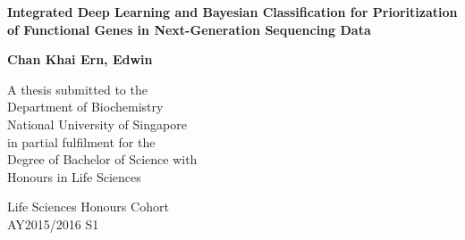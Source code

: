 \documentclass{article}
\begin{document}
\begin{titlepage}


    \begin{center} 
	\Large
        \vspace*{1cm}
        
        \textbf{ Integrated Deep Learning and Bayesian Classification for Prioritization of Functional Genes in Next-Generation Sequencing Data }
        
        \vspace{0.5cm}
        
        \vspace{1.0cm}
        
        \textbf{Chan Khai Ern, Edwin}
        
\vspace{9.0cm}
        \normalsize
       A thesis submitted to the \\
Department of Biochemistry \\
National University of Singapore \\
in partial fulfilment for the \\
Degree of Bachelor of Science with \\Honours
in
Life Sciences\\

        
        \vspace{1.5cm}
        
        
        Life Sciences Honours Cohort \\
        AY2015/2016 S1\\
       
        
    \end{center}
\end{titlepage}


\doublespace
\normalsize
\end{document}

